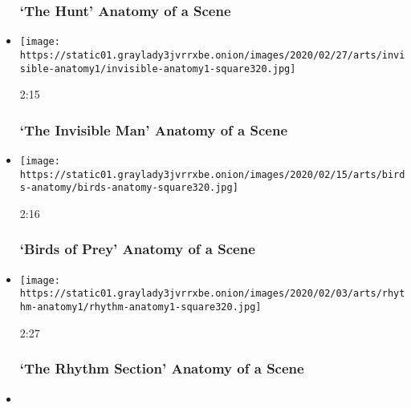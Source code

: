 \begin{itemize}
  \hypertarget{the-hunt--anatomy-of-a-scene}{%
  \subsubsection{`The Hunt' \textbar{} Anatomy of a
  Scene}\label{the-hunt--anatomy-of-a-scene}}
\item
  \href{https://www.nytimes3xbfgragh.onion/video/movies/100000007004489/the-invisible-man-scene.html?action=click\&module=video-series-bar\&region=header\&pgtype=Article\&playlistId=video/anatomy-of-a-scene}{}

  \texttt{[image: https://static01.graylady3jvrrxbe.onion/images/2020/02/27/arts/invisible-anatomy1/invisible-anatomy1-square320.jpg]}

  2:15

  \hypertarget{the-invisible-man--anatomy-of-a-scene}{%
  \subsubsection{`The Invisible Man' \textbar{} Anatomy of a
  Scene}\label{the-invisible-man--anatomy-of-a-scene}}
\item
  \href{https://www.nytimes3xbfgragh.onion/video/movies/100000006978741/harley-quinn-birds-of-prey-scene.html?action=click\&module=video-series-bar\&region=header\&pgtype=Article\&playlistId=video/anatomy-of-a-scene}{}

  \texttt{[image: https://static01.graylady3jvrrxbe.onion/images/2020/02/15/arts/birds-anatomy/birds-anatomy-square320.jpg]}

  2:16

  \hypertarget{birds-of-prey--anatomy-of-a-scene}{%
  \subsubsection{`Birds of Prey' \textbar{} Anatomy of a
  Scene}\label{birds-of-prey--anatomy-of-a-scene}}
\item
  \href{https://www.nytimes3xbfgragh.onion/video/movies/100000006958037/the-rhythm-section-anatomy-of-a-scene.html?action=click\&module=video-series-bar\&region=header\&pgtype=Article\&playlistId=video/anatomy-of-a-scene}{}

  \texttt{[image: https://static01.graylady3jvrrxbe.onion/images/2020/02/03/arts/rhythm-anatomy1/rhythm-anatomy1-square320.jpg]}

  2:27

  \hypertarget{the-rhythm-section--anatomy-of-a-scene}{%
  \subsubsection{`The Rhythm Section' \textbar{} Anatomy of a
  Scene}\label{the-rhythm-section--anatomy-of-a-scene}}
\item
  \href{https://www.nytimes3xbfgragh.onion/video/movies/100000006951296/the-irishman-scene.html?action=click\&module=video-series-bar\&region=header\&pgtype=Article\&playlistId=video/anatomy-of-a-scene}{}


\end{itemize}
